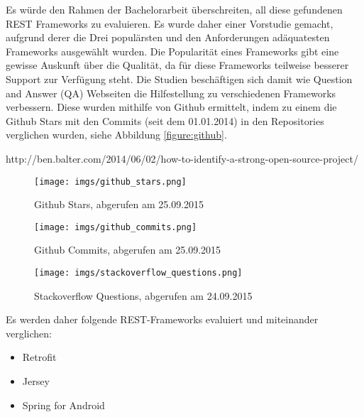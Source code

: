 \documentclass[a4paper,11pt,german,public]{INSOexpose}
\begin{document}
Es würde den Rahmen der Bachelorarbeit überschreiten, all diese gefundenen REST Frameworks zu evaluieren. Es wurde daher einer Vorstudie gemacht, aufgrund derer die Drei populärsten und den Anforderungen adäquatesten Frameworks ausgewählt wurden. Die Popularität eines Frameworks gibt eine gewisse Auskunft über die Qualität, da für diese Frameworks teilweise besserer Support zur Verfügung steht. Die Studien\cite{parnin2012crowd} beschäftigen sich damit wie Question and Answer (QA) Webseiten die Hilfestellung zu verschiedenen Frameworks verbessern. Diese wurden mithilfe von Github ermittelt, indem zu einem die Github Stars mit den Commits (seit dem 01.01.2014)  in den Repositories verglichen wurden, siehe Abbildung \ref{figure:github}.

http://ben.balter.com/2014/06/02/how-to-identify-a-strong-open-source-project/

\begin{figure}[!htbp]
	\centering	
	\texttt{[image: imgs/github\_stars.png]}
	\caption{Github Stars, abgerufen am 25.09.2015}	
	\label{figure:githubStars}
\end{figure}

\begin{figure}[!htbp]
	\centering	
	\texttt{[image: imgs/github\_commits.png]}
	\caption{Github Commits, abgerufen am 25.09.2015}	
	\label{figure:githubCommits}
\end{figure}

\begin{figure}[!htbp]
	\centering	
	\texttt{[image: imgs/stackoverflow\_questions.png]}
	\caption{Stackoverflow Questions, abgerufen am 24.09.2015}	
	\label{figure:stackoverflowQuestions}
\end{figure}


Es werden daher folgende REST-Frameworks evaluiert und miteinander verglichen:

\begin{itemize}
	\item Retrofit 
	\item Jersey
	\item Spring for Android
\end{itemize}

\end{document}

